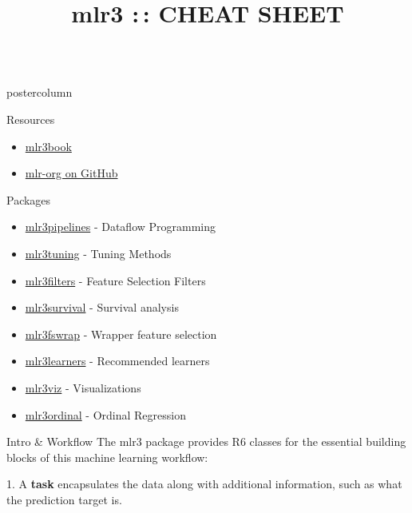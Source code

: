 \documentclass{beamer}
\title{mlr3 :\,: CHEAT SHEET} %
\newlength{\columnheight} %
\begin{document}
\begin{frame}[fragile]{}
\begin{columns}
	\begin{column}{.245\textwidth}
		\begin{beamercolorbox}[center]{postercolumn}
			\begin{minipage}{.98\textwidth}
				\parbox[t][\columnheight]{\textwidth}{
					\begin{myblock}{Resources}
						\begin{itemize}
							\item \href{https://mlr3book.mlr-org.com/index.html}{mlr3book}
							\item \href{https://github.com/mlr-org}{mlr-org on GitHub} 
						\end{itemize}
					\end{myblock}
						\begin{myblock}{Packages}
										\vfill
						\begin{itemize}
							\item \href{https://github.com/mlr-org/mlr3pipelines}{mlr3pipelines} - Dataflow Programming
							\item \href{https://github.com/mlr-org/mlr3tuning}{mlr3tuning} - Tuning Methods
							\item \href{https://github.com/mlr-org/mlr3filters}{mlr3filters} - Feature Selection Filters
							\item \href{https://github.com/mlr-org/mlr3survival}{mlr3survival} - Survival analysis
							\item \href{https://github.com/mlr-org/mlr3fswrap}{mlr3fswrap} - Wrapper feature selection
							\item \href{https://github.com/mlr-org/mlr3learners}{mlr3learners} - Recommended learners
							\item \href{https://github.com/mlr-org/mlr3viz}{mlr3viz} - Visualizations
							\item \href{https://github.com/mlr-org/mlr3ordinal}{mlr3ordinal} - Ordinal Regression
						\end{itemize}
					\end{myblock}

					\begin{myblock}{Intro \& Workflow}
					The mlr3 package provides R6 classes for the essential building
					blocks of this machine learning workflow:
					
          1. A \textbf{task} encapsulates the data along with additional information, such as 
          what the prediction target is.
          

\end{myblock}}
\end{minipage}
\end{beamercolorbox}
\end{column}
\end{columns}
\end{frame}
\end{document}
